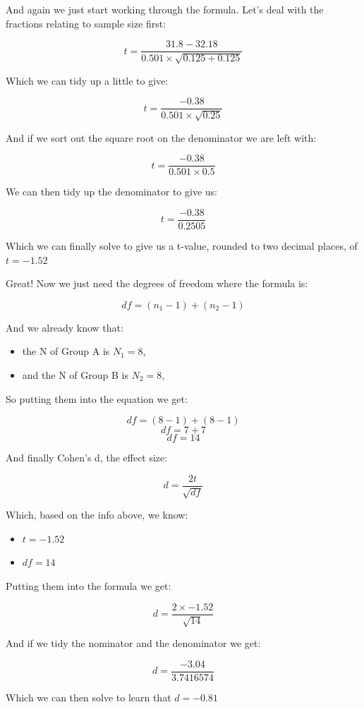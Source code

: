 \documentclass[
  oneside]{book}
\providecommand{\tightlist}{%
  \setlength{\itemsep}{0pt}\setlength{\parskip}{0pt}}
\begin{document}
And again we just start working through the formula. Let's deal with the fractions relating to sample size first:

\[t = \frac{31.8 - 32.18}{0.501 \times \sqrt{0.125 + 0.125}}\]

Which we can tidy up a little to give:

\[t = \frac{-0.38}{0.501 \times \sqrt{0.25}}\]

And if we sort out the square root on the denominator we are left with:

\[t = \frac{-0.38}{0.501 \times 0.5}\]

We can then tidy up the denominator to give us:

\[t = \frac{-0.38}{0.2505}\]

Which we can finally solve to give us a t-value, rounded to two decimal places, of \(t = -1.52\)

Great! Now we just need the degrees of freedom where the formula is:

\[df = (n_1 - 1) + (n_2 - 1)\]

And we already know that:

\begin{itemize}
\tightlist
\item
  the N of Group A is \(N_1 = 8\),
\item
  and the N of Group B is \(N_2 = 8\),
\end{itemize}

So putting them into the equation we get:

\[df = (8 - 1) + (8 - 1)\]
\[df = 7 + 7\]
\[df = 14\]

And finally Cohen's d, the effect size:

\[d = \frac{2t}{\sqrt{df}}\]

Which, based on the info above, we know:

\begin{itemize}
\tightlist
\item
  \(t = -1.52\)
\item
  \(df = 14\)
\end{itemize}

Putting them into the formula we get:

\[d = \frac{2 \times -1.52}{\sqrt{14}}\]

And if we tidy the nominator and the denominator we get:

\[d = \frac{-3.04}{3.7416574}\]

Which we can then solve to learn that \(d = -0.81\)
\end{document}
